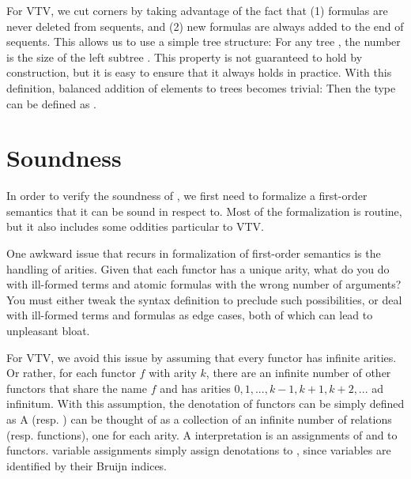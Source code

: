 \documentclass[12pt]{article}
\begin{document}
For VTV, we cut corners by taking advantage of the fact that (1) formulas 
are never deleted from sequents, and (2) new formulas are always added to the 
end of sequents. This allows us to use a simple tree structure:
For any tree     ,
the number  is the size of the left subtree . 
This property is not guaranteed to hold by construction,
but it is easy to ensure that it always holds in practice. With this definition,
balanced addition of elements to trees becomes trivial:
Then the type  can be defined as .



\section{Soundness} \label{sec:soundness}

In order to verify the soundness of , we first need to formalize 
a first-order semantics that it can be sound in respect to. Most of the formalization 
is routine, but it also includes some oddities particular to VTV.

One awkward issue that recurs in formalization of first-order semantics is the 
handling of arities. Given that each functor has a unique arity,
what do you do with ill-formed terms and atomic formulas with the wrong 
number of arguments? You must either tweak the syntax definition to 
preclude such possibilities, or deal with ill-formed terms and formulas as 
edge cases, both of which can lead to unpleasant bloat. 

For VTV, we avoid this issue by assuming that every functor has infinite arities.
Or rather, for each functor $f$ with arity $k$, there are an infinite number 
of other functors that share the name $f$ and has arities $0, 1, ..., k-1, k+1, k+2, ...$ 
ad infinitum. With this assumption, the denotation of functors can be 
simply defined as 
A  (resp. ) can be thought of as a 
collection of an infinite number of relations (resp. functions), one for 
each arity. A interpretation is an assignments of  and 
 to functors.
variable assignments simply assign denotations to , since variables are 
identified by their Bruijn indices.
\end{document}
